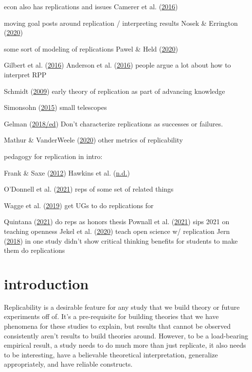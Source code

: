 \documentclass[
  english,
  a4paper,
]{article}
\begin{document}
econ also has replications and issues Camerer et al. (\protect\hyperlink{ref-camerer2016}{2016})

moving goal posts around replication / interpreting results Nosek \& Errington (\protect\hyperlink{ref-nosek2020}{2020})

some sort of modeling of replications Pawel \& Held (\protect\hyperlink{ref-pawel2020}{2020})

Gilbert et al. (\protect\hyperlink{ref-gilbert2016}{2016}) Anderson et al. (\protect\hyperlink{ref-anderson2016}{2016}) people argue a lot about how to interpret RPP

Schmidt (\protect\hyperlink{ref-schmidt2009}{2009}) early theory of replication as part of advancing knowledge

Simonsohn (\protect\hyperlink{ref-simonsohn2015}{2015}) small telescopes

Gelman (\protect\hyperlink{ref-gelman2018}{2018/ed}) Don't characterize replications as successes or failures.

Mathur \& VanderWeele (\protect\hyperlink{ref-mathur2020}{2020}) other metrics of replicability

pedagogy for replication in intro:

Frank \& Saxe (\protect\hyperlink{ref-frank2012}{2012})
Hawkins et al. (\protect\hyperlink{ref-hawkins}{n.d.})

O'Donnell et al. (\protect\hyperlink{ref-odonnell2021}{2021}) reps of some set of related things

Wagge et al. (\protect\hyperlink{ref-wagge2019}{2019}) get UGs to do replications for

Quintana (\protect\hyperlink{ref-quintana2021}{2021}) do reps as honors thesis
Pownall et al. (\protect\hyperlink{ref-pownall2021}{2021}) sips 2021 on teaching openness
Jekel et al. (\protect\hyperlink{ref-jekel2020}{2020}) teach open science w/ replication
Jern (\protect\hyperlink{ref-jern2018}{2018}) in one study didn't show critical thinking benefits for students to make them do replications

\hypertarget{introduction}{%
\section{introduction}\label{introduction}}

Replicability is a desirable feature for any study that we build theory or future experiments off of. It's a pre-requisite for building theories that we have phenomena for these studies to explain, but results that cannot be observed consistently aren't results to build theories around. However, to be a load-bearing empirical result, a study needs to do much more than just replicate, it also needs to be interesting, have a believable theoretical interpretation, generalize appropriately, and have reliable constructs.
\end{document}
